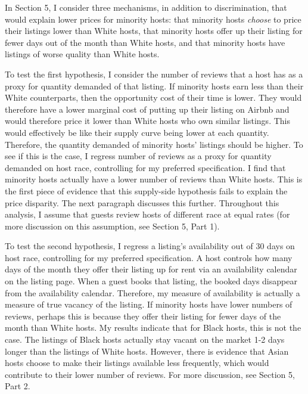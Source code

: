 \documentclass[11pt, oneside]{article}
\begin{document}
In Section 5, I consider three mechanisms, in addition to discrimination, that would explain lower prices for minority hosts: that minority hosts \textit{choose} to price their listings lower than White hosts, that minority hosts offer up their listing for fewer days out of the month than White hosts, and that minority hosts have listings of worse quality than White hosts. 

To test the first hypothesis, I consider the number of reviews that a host has as a proxy for quantity demanded of that listing. If minority hosts earn less than their White counterparts, then the opportunity cost of their time is lower. They would therefore have a lower marginal cost of putting up their listing on Airbnb and would therefore price it lower than White hosts who own similar listings. This would effectively be like their supply curve being lower at each quantity. Therefore, the quantity demanded of minority hosts' listings should be higher. To see if this is the case, I regress number of reviews as a proxy for quantity demanded on host race, controlling for my preferred specification. I find that minority hosts actually have a lower number of reviews than White hosts. This is the first piece of evidence that this supply-side hypothesis fails to explain the price disparity. The next paragraph discusses this further. Throughout this analysis, I assume that guests review hosts of different race at equal rates (for more discussion on this assumption, see Section 5, Part 1). 

To test the second hypothesis, I regress a listing's availability out of 30 days on host race, controlling for my preferred specification. A host controls how many days of the month they offer their listing up for rent via an availability calendar on the listing page. When a guest books that listing, the booked days disappear from the availability calendar. Therefore, my measure of availability is actually a measure of true vacancy of the listing. If minority hosts have lower numbers of reviews, perhaps this is because they offer their listing for fewer days of the month than White hosts. My results indicate that for Black hosts, this is not the case. The listings of Black hosts actually stay vacant on the market 1-2 days longer than the listings of White hosts. However, there is evidence that Asian hosts choose to make their listings available less frequently, which would contribute to their lower number of reviews. For more discussion, see Section 5, Part 2.      
\end{document}
